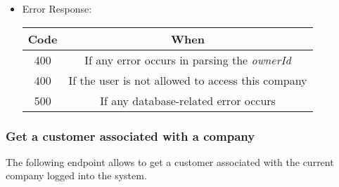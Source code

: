 \begin{itemize}
    \item Error Response:
    \begin{table}[!h]
    \centering
    \begin{tabular}{|c|c|}
    \hline
    \multicolumn{1}{|c|}{\textbf{Code}} & \multicolumn{1}{c|}{\textbf{When}} \\ \hline
    400 & If any error occurs in parsing the \textit{ownerId}  \\\hline
    400 & If the user is not allowed to access this company \\\hline
    500 & If any database-related error occurs \\\hline
    \end{tabular}
    \end{table}

\end{itemize}


\newpage
\subsubsection*{Get a customer associated with a company}

The following endpoint allows to get a customer associated with the current company logged into the system.

